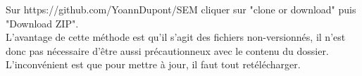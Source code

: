 \documentclass[manual-fr.tex]{subfiles}
\begin{document}
Sur https://github.com/YoannDupont/SEM cliquer sur "clone or download" puis "Download ZIP".\\

L'avantage de cette méthode est qu'il s'agit des fichiers non-versionnés, il
n'est donc pas nécessaire d'être aussi précautionneux avec le contenu du
dossier. L'inconvénient est que pour mettre à jour, il faut tout
retélécharger.
\end{document}
